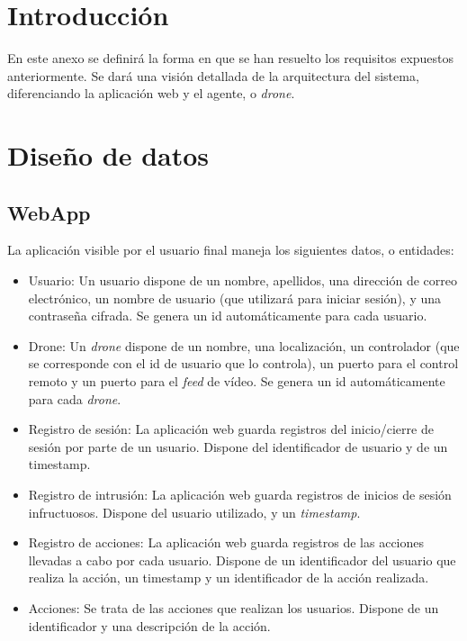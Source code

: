 
\section{Introducción}
En este anexo se definirá la forma en que se han resuelto los requisitos expuestos anteriormente. Se dará una visión detallada de la arquitectura del sistema, diferenciando la aplicación web y el agente, o \emph{drone}.

\section{Diseño de datos}
\subsection{WebApp}
La aplicación visible por el usuario final maneja los siguientes datos, o entidades:
\begin{itemize}
\item Usuario: Un usuario dispone de un nombre, apellidos, una dirección de correo electrónico, un nombre de usuario (que utilizará para iniciar sesión), y una contraseña cifrada. Se genera un id automáticamente para cada usuario.
\item Drone: Un \emph{drone} dispone de un nombre, una localización, un controlador (que se corresponde con el id de usuario que lo controla), un puerto para el control remoto y un puerto para el \emph{feed} de vídeo. Se genera un id automáticamente para cada \emph{drone}.
\item Registro de sesión: La aplicación web guarda registros del inicio/cierre de sesión por parte de un usuario. Dispone del identificador de usuario y de un timestamp.
\item Registro de intrusión: La aplicación web guarda registros de inicios de sesión infructuosos. Dispone del usuario utilizado, y un \emph{timestamp}.
\item Registro de acciones: La aplicación web guarda registros de las acciones llevadas a cabo por cada usuario. Dispone de un identificador del usuario que realiza la acción, un timestamp y un identificador de la acción realizada.
\item Acciones: Se trata de las acciones que realizan los usuarios. Dispone de un identificador y una descripción de la acción.
\end{itemize}

